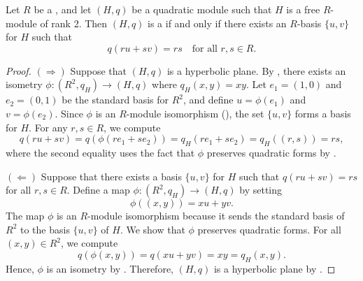 \begin{proposition} \label{proposition:isomorphism_criterion_for_a_quadratic_module_over_a_commutative_ring_to_be_a_hyperbolic_plane}
    Let $R$ be a , and let $(H, q)$ be a quadratic module such that $H$ is a free $R$-module of rank 2. Then $(H, q)$ is a  if and only if there exists an $R$-basis $\{u, v\}$ for $H$ such that
    $$q(r u + s v) = rs \quad \text{for all } r, s \in R.$$

\end{proposition}
\begin{proof}
    $(\Rightarrow)$ Suppose that $(H, q)$ is a hyperbolic plane. By , there exists an isometry $\phi: (R^2, q_H) \to (H, q)$ where $q_H(x, y) = xy$. Let $e_1 = (1, 0)$ and $e_2 = (0, 1)$ be the standard basis for $R^2$, and define $u = \phi(e_1)$ and $v = \phi(e_2)$. Since $\phi$ is an $R$-module isomorphism (), the set $\{u, v\}$ forms a basis for $H$. For any $r, s \in R$, we compute
    $$q(r u + s v) = q(\phi(r e_1 + s e_2)) = q_H(r e_1 + s e_2) = q_H((r, s)) = rs,$$
    where the second equality uses the fact that $\phi$ preserves quadratic forms by .

    $(\Leftarrow)$ Suppose that there exists a basis $\{u, v\}$ for $H$ such that $q(r u + s v) = rs$ for all $r, s \in R$. Define a map $\phi: (R^2, q_H) \to (H, q)$ by setting
    $$\phi((x, y)) = x u + y v.$$
    The map $\phi$ is an $R$-module isomorphism because it sends the standard basis of $R^2$ to the basis $\{u, v\}$ of $H$. We show that $\phi$ preserves quadratic forms. For all $(x, y) \in R^2$, we compute
    $$q(\phi(x, y)) = q(x u + y v) = xy = q_H(x, y).$$
    Hence, $\phi$ is an isometry by . Therefore, $(H, q)$ is a hyperbolic plane by .
\end{proof}